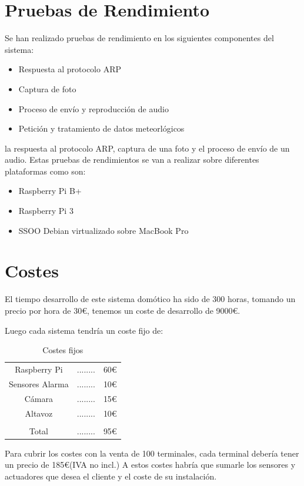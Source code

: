 \documentclass[10pt,journal,compsoc]{IEEEtran}
\begin{document}
\section{Pruebas de Rendimiento}
Se han realizado pruebas de rendimiento en los siguientes componentes del sistema:
\begin{itemize}
  \item Respuesta al protocolo ARP
  \item Captura de foto
  \item Proceso de envío y reproducción de audio
  \item Petición y tratamiento de datos meteorlógicos
\end{itemize}
 la respuesta al protocolo ARP, captura de una foto y el proceso de envío de 
un audio. Estas pruebas de rendimientos se van a realizar sobre diferentes 
plataformas como son:
\begin{itemize}
\item Raspberry Pi B+
\item Raspberry Pi 3
\item SSOO Debian virtualizado sobre MacBook Pro
\end{itemize}

\section{Costes}
El tiempo desarrollo de este sistema domótico ha sido de 300 horas, tomando un 
precio por hora de 30\euro, tenemos un coste de desarrollo de 9000\euro.

Luego cada sistema tendría un coste fijo de:
\begin{table}[h]
\centering
\begin{tabular}{ccc}
Raspberry Pi & ........ & 60\euro \\
Sensores Alarma & ........ & 10\euro \\
Cámara & ........ & 15\euro \\
Altavoz & ........ & 10\euro \\
\hline \\
Total & ........ & 95\euro \\
\end{tabular} 
\caption{Costes fijos}
\label{tab:CostesFij}
\end{table}

Para cubrir los costes con la venta de 100 terminales, cada terminal debería tener un precio de 
185\euro (IVA no incl.)
A estos costes habría que sumarle los sensores y actuadores que desea el cliente y el coste 
de su instalación.
\end{document}
